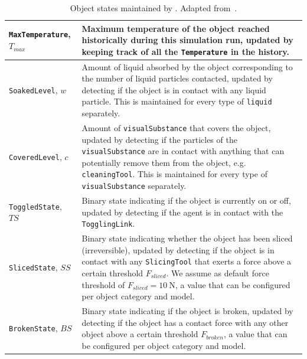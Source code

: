 \begin{table}[!htbp]
\begin{center}
{\begin{tabular}{ | m{4cm} | m{9cm} | }
\hline
\texttt{MaxTemperature}, $T_\textit{max}$ & Maximum temperature of the object reached historically during this simulation run, updated by keeping track of all the \texttt{Temperature} in the history.\\ 
\hline
\texttt{SoakedLevel}, $w$ & Amount of liquid absorbed by the object corresponding to the number of liquid particles contacted, updated by detecting if the object is in contact with any liquid particle. This is maintained for every type of \texttt{liquid} separately. \\ 
\hline
\texttt{CoveredLevel}, $c$ & Amount of \texttt{visualSubstance} that covers the object, updated by detecting if the particles of the \texttt{visualSubstance} are in contact with anything that can potentially remove them from the object, e.g. \texttt{cleaningTool}. This is maintained for every type of \texttt{visualSubstance} separately. \\ 
\hline
\texttt{ToggledState}, $\textit{TS}$ & Binary state indicating if the object is currently on or off, updated by detecting if the agent is in contact with the \texttt{TogglingLink}.\\ 
\hline
\texttt{SlicedState}, $\textit{SS}$ & Binary state indicating whether the object has been sliced (irreversible), updated by detecting if the object is in contact with any \texttt{SlicingTool} that exerts a force above a certain threshold $F_\mathit{sliced}$. We assume as default force threshold of $F_\mathit{sliced} = \SI{10}{\newton}$, a value that can be configured per object category and model.\\ 
\hline
\texttt{BrokenState}, $\textit{BS}$ & Binary state indicating if the object is broken, updated by detecting if the object has a contact force with any other object above a certain threshold $F_\mathit{broken}$, a value that can be configured per object category and model.\\ 
\hline
\end{tabular}
}
\vspace{3pt}
\caption{Object states maintained by \simulator. Adapted from~\cite{li2021ig2}.}
\label{table:obj_states}
\end{center}
\end{table}